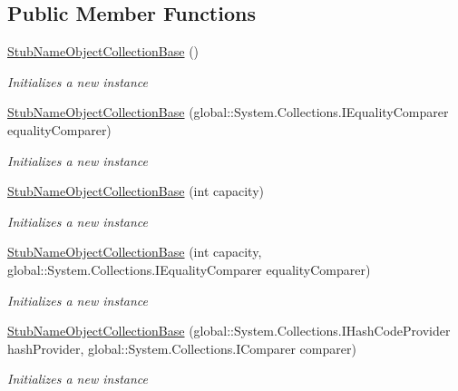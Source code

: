 \subsection*{Public Member Functions}
\begin{DoxyCompactItemize}
\item 
\hyperlink{class_system_1_1_collections_1_1_specialized_1_1_fakes_1_1_stub_name_object_collection_base_ac6785a4ac62fe6b4c474902a5eb667d9}{Stub\-Name\-Object\-Collection\-Base} ()
\begin{DoxyCompactList}\small\item\em Initializes a new instance\end{DoxyCompactList}\item 
\hyperlink{class_system_1_1_collections_1_1_specialized_1_1_fakes_1_1_stub_name_object_collection_base_af45b76b802141af490500928d69145d9}{Stub\-Name\-Object\-Collection\-Base} (global\-::\-System.\-Collections.\-I\-Equality\-Comparer equality\-Comparer)
\begin{DoxyCompactList}\small\item\em Initializes a new instance\end{DoxyCompactList}\item 
\hyperlink{class_system_1_1_collections_1_1_specialized_1_1_fakes_1_1_stub_name_object_collection_base_a61b512a180e582ddd91a1f021c447397}{Stub\-Name\-Object\-Collection\-Base} (int capacity)
\begin{DoxyCompactList}\small\item\em Initializes a new instance\end{DoxyCompactList}\item 
\hyperlink{class_system_1_1_collections_1_1_specialized_1_1_fakes_1_1_stub_name_object_collection_base_a0c195b4640fb27e121fb4d37c9c7707e}{Stub\-Name\-Object\-Collection\-Base} (int capacity, global\-::\-System.\-Collections.\-I\-Equality\-Comparer equality\-Comparer)
\begin{DoxyCompactList}\small\item\em Initializes a new instance\end{DoxyCompactList}\item 
\hyperlink{class_system_1_1_collections_1_1_specialized_1_1_fakes_1_1_stub_name_object_collection_base_af20ed2862e0a545dc00347553d92ca2a}{Stub\-Name\-Object\-Collection\-Base} (global\-::\-System.\-Collections.\-I\-Hash\-Code\-Provider hash\-Provider, global\-::\-System.\-Collections.\-I\-Comparer comparer)
\begin{DoxyCompactList}\small\item\em Initializes a new instance\end{DoxyCompactList}\item 

\end{DoxyCompactItemize}
